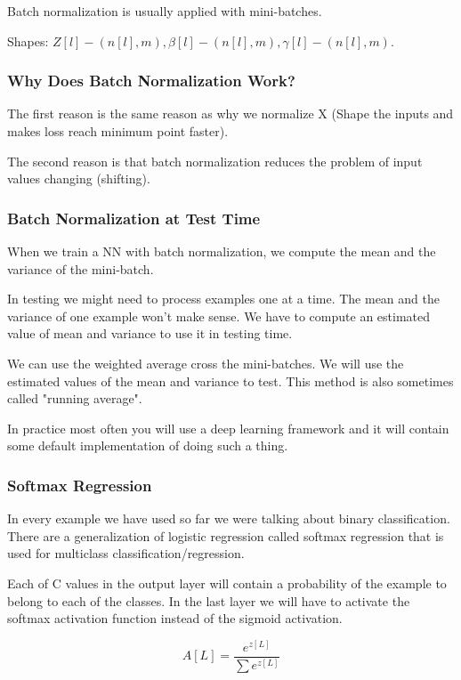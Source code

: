 Batch normalization is usually applied with mini-batches.

Shapes: $Z[l] - (n[l], m), \beta[l] - (n[l], m), \gamma[l] - (n[l], m)$.

\subsubsection{Why Does Batch Normalization Work?}
The first reason is the same reason as why we normalize X (Shape the inputs and makes loss reach minimum point faster).

The second reason is that batch normalization reduces the problem of input values changing (shifting).

\subsubsection{Batch Normalization at Test Time}
When we train a NN with batch normalization, we compute the mean and the variance of the mini-batch.

In testing we might need to process examples one at a time. The mean and the variance of one example won't make sense. We have to compute an estimated value of mean and variance to use it in testing time.

We can use the weighted average cross the mini-batches. We will use the estimated values of the mean and variance to test. This method is also sometimes called "running average".

In practice most often you will use a deep learning framework and it will contain some default implementation of doing such a thing.

\subsubsection{Softmax Regression}
In every example we have used so far we were talking about binary classification. There are a generalization of logistic regression called softmax regression that is used for multiclass classification/regression.

Each of C values in the output layer will contain a probability of the example to belong to each of the classes. In the last layer we will have to activate the softmax activation function instead of the sigmoid activation.

\begin{equation}
    A[L] = \frac{e^{z[L]}}{\sum e^{z[L]}}
\end{equation}

